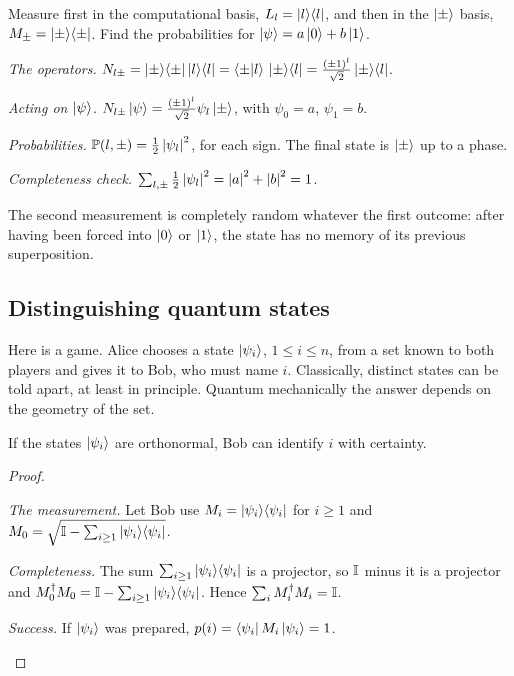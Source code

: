 \begin{example}\label{ex:cascade}
  Measure first in the computational basis, $L_l=\left|l\right\rangle\!\left\langle l\right|$, and then in the $\left|\pm\right\rangle$ basis, $M_\pm=\left|\pm\right\rangle\!\left\langle\pm\right|$. Find the probabilities for $\left|\psi\right\rangle=a\left|0\right\rangle+b\left|1\right\rangle$.
\end{example}
\begin{solution}
  \begin{steps}
    \item \emph{The operators.} $N_{l\pm}=\left|\pm\right\rangle\!\left\langle\pm\right|\left|l\right\rangle\!\left\langle l\right|=\left\langle\pm\middle|l\right\rangle\,\left|\pm\right\rangle\!\left\langle l\right|=\frac{(\pm1)^l}{\sqrt2}\left|\pm\right\rangle\!\left\langle l\right|$.
    \item \emph{Acting on $\left|\psi\right\rangle$.} $N_{l\pm}\left|\psi\right\rangle=\frac{(\pm1)^l}{\sqrt2}\psi_l\left|\pm\right\rangle$, with $\psi_0=a$, $\psi_1=b$.
    \item \emph{Probabilities.} $\mathbb{P}(l,\pm)=\tfrac12\left|\psi_l\right|^2$, for each sign. The final state is $\left|\pm\right\rangle$ up to a phase.
    \item \emph{Completeness check.} $\sum_{l,\pm}\tfrac12\left|\psi_l\right|^2=\left|a\right|^2+\left|b\right|^2=1$.
  \end{steps}
  The second measurement is completely random whatever the first outcome: after having been forced into $\left|0\right\rangle$ or $\left|1\right\rangle$, the state has no memory of its previous superposition.
\end{solution}

\subsection{Distinguishing quantum states}

Here is a game. Alice chooses a state $\left|\psi_i\right\rangle$, $1\le i\le n$, from a set known to both players and gives it to Bob, who must name $i$. Classically, distinct states can be told apart, at least in principle. Quantum mechanically the answer depends on the geometry of the set.

\begin{proposition}\label{prop:distinguish-orthogonal}
  If the states $\left|\psi_i\right\rangle$ are orthonormal, Bob can identify $i$ with certainty.
\end{proposition}
\begin{proof}
  \begin{steps}
    \item \emph{The measurement.} Let Bob use $M_i=\left|\psi_i\right\rangle\!\left\langle\psi_i\right|$ for $i\ge1$ and $M_0=\sqrt{\mathbb{I}-\sum_{i\ge1}\left|\psi_i\right\rangle\!\left\langle\psi_i\right|}$.
    \item \emph{Completeness.} The sum $\sum_{i\ge1}\left|\psi_i\right\rangle\!\left\langle\psi_i\right|$ is a projector, so $\mathbb{I}$ minus it is a projector and $M_0^\dagger M_0=\mathbb{I}-\sum_{i\ge1}\left|\psi_i\right\rangle\!\left\langle\psi_i\right|$. Hence $\sum_iM_i^\dagger M_i=\mathbb{I}$.
    \item \emph{Success.} If $\left|\psi_i\right\rangle$ was prepared, $p(i)=\left\langle\psi_i\right|M_i\left|\psi_i\right\rangle=1$. \qedhere
  \end{steps}
\end{proof}

